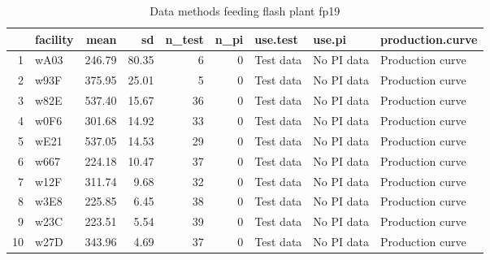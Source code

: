 \begin{table}[H]
\centering
\begin{tabular}{rlrrrrlll}
  \hline
 & facility & mean & sd & n\_test & n\_pi & use.test & use.pi & production.curve \\ 
  \hline
1 & wA03 & 246.79 & 80.35 &   6 &   0 & Test data & No PI data & Production curve \\ 
  2 & w93F & 375.95 & 25.01 &   5 &   0 & Test data & No PI data & Production curve \\ 
  3 & w82E & 537.40 & 15.67 &  36 &   0 & Test data & No PI data & Production curve \\ 
  4 & w0F6 & 301.68 & 14.92 &  33 &   0 & Test data & No PI data & Production curve \\ 
  5 & wE21 & 537.05 & 14.53 &  29 &   0 & Test data & No PI data & Production curve \\ 
  6 & w667 & 224.18 & 10.47 &  37 &   0 & Test data & No PI data & Production curve \\ 
  7 & w12F & 311.74 & 9.68 &  32 &   0 & Test data & No PI data & Production curve \\ 
  8 & w3E8 & 225.85 & 6.45 &  38 &   0 & Test data & No PI data & Production curve \\ 
  9 & w23C & 223.51 & 5.54 &  39 &   0 & Test data & No PI data & Production curve \\ 
  10 & w27D & 343.96 & 4.69 &  37 &   0 & Test data & No PI data & Production curve \\ 
   \hline
\end{tabular}
\caption{Data methods feeding flash plant fp19} 
\label{tab:well_summaries_fp16}
\end{table}
